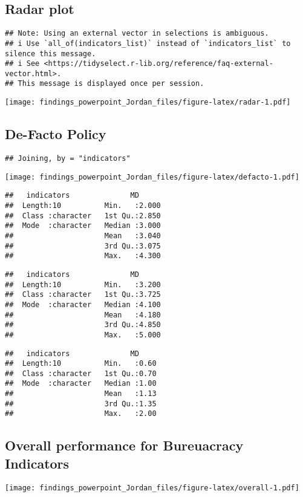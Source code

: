 \documentclass[
]{article}
\begin{document}
\hypertarget{radar-plot}{%
\subsection{Radar plot}\label{radar-plot}}

\begin{verbatim}
## Note: Using an external vector in selections is ambiguous.
## i Use `all_of(indicators_list)` instead of `indicators_list` to silence this message.
## i See <https://tidyselect.r-lib.org/reference/faq-external-vector.html>.
## This message is displayed once per session.
\end{verbatim}

\texttt{[image: findings\_powerpoint\_Jordan\_files/figure-latex/radar-1.pdf]}

\hypertarget{de-facto-policy}{%
\subsection{De-Facto Policy}\label{de-facto-policy}}

\begin{verbatim}
## Joining, by = "indicators"
\end{verbatim}

\texttt{[image: findings\_powerpoint\_Jordan\_files/figure-latex/defacto-1.pdf]}

\begin{verbatim}
##   indicators              MD       
##  Length:10          Min.   :2.000  
##  Class :character   1st Qu.:2.850  
##  Mode  :character   Median :3.000  
##                     Mean   :3.040  
##                     3rd Qu.:3.075  
##                     Max.   :4.300
\end{verbatim}

\begin{verbatim}
##   indicators              MD       
##  Length:10          Min.   :3.200  
##  Class :character   1st Qu.:3.725  
##  Mode  :character   Median :4.100  
##                     Mean   :4.180  
##                     3rd Qu.:4.850  
##                     Max.   :5.000
\end{verbatim}

\begin{verbatim}
##   indicators              MD      
##  Length:10          Min.   :0.60  
##  Class :character   1st Qu.:0.70  
##  Mode  :character   Median :1.00  
##                     Mean   :1.13  
##                     3rd Qu.:1.35  
##                     Max.   :2.00
\end{verbatim}

\hypertarget{overall-performance-for-bureuacracy-indicators}{%
\subsection{Overall performance for Bureuacracy
Indicators}\label{overall-performance-for-bureuacracy-indicators}}

\texttt{[image: findings\_powerpoint\_Jordan\_files/figure-latex/overall-1.pdf]}
\end{document}
